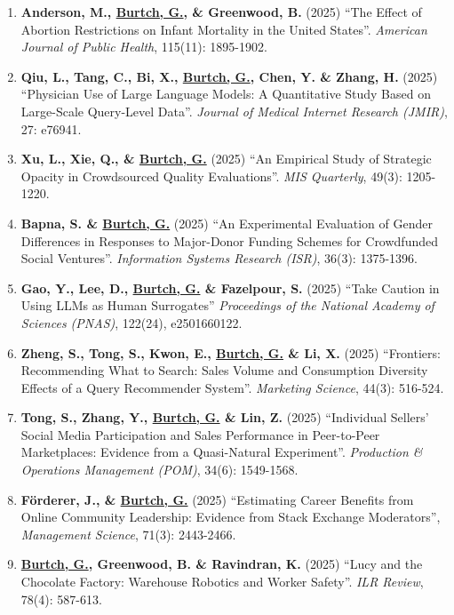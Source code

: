 \documentclass[10.5pt,letterpaper,sans]{moderncv}        %
\begin{document}
\begin{enumerate}[leftmargin=!,labelindent=5pt,itemindent=-15pt]
\item \textbf{Anderson, M., \underline{Burtch, G.}, \& Greenwood, B.} (2025) ``The Effect of Abortion Restrictions on Infant Mortality in the United States''. \textit{American Journal of Public Health}, 115(11): 1895-1902.

\item \textbf{Qiu, L., Tang, C., Bi, X., \underline{Burtch, G.}, Chen, Y. \& Zhang, H.} (2025) ``Physician Use of Large Language Models: A Quantitative Study Based on Large-Scale Query-Level Data''. \textit{Journal of Medical Internet Research (JMIR)}, 27: e76941.

\item \textbf{Xu, L., Xie, Q., \& \underline{Burtch, G.}} (2025) ``An Empirical Study of Strategic Opacity in Crowdsourced Quality Evaluations''. \textit{MIS Quarterly}, 49(3): 1205-1220.

\item \textbf{Bapna, S. \& \underline{Burtch, G.}} (2025) ``An Experimental Evaluation of Gender Differences in Responses to Major-Donor Funding Schemes for Crowdfunded Social Ventures''. \textit{Information Systems Research (ISR)}, 36(3): 1375-1396.

\item \textbf{Gao, Y., Lee, D., \underline{Burtch, G.} \& Fazelpour, S.} (2025) ``Take Caution in Using LLMs as Human Surrogates'' \textit{Proceedings of the National Academy of Sciences (PNAS)}, 122(24), e2501660122.

\item \textbf{Zheng, S., Tong, S., Kwon, E., \underline{Burtch, G.} \& Li, X.} (2025) ``Frontiers: Recommending What to Search: Sales Volume and Consumption Diversity Effects of a Query Recommender System''. \textit{Marketing Science}, 44(3): 516-524.

\item \textbf{Tong, S., Zhang, Y.,  \underline{Burtch, G.} \& Lin, Z.} (2025) ``Individual Sellers' Social Media Participation and Sales Performance in Peer-to-Peer Marketplaces: Evidence from a Quasi-Natural Experiment''. \textit{Production \& Operations Management (POM)}, 34(6): 1549-1568.

\item \textbf{F{\"o}rderer, J., \& \underline{Burtch, G.}} (2025) ``Estimating Career Benefits from Online Community Leadership: Evidence from Stack Exchange Moderators'', \textit{Management Science}, 71(3): 2443-2466.

\item \textbf{\underline{Burtch, G.}, Greenwood, B. \& Ravindran, K.} (2025) ``Lucy and the Chocolate Factory: Warehouse Robotics and Worker Safety''. \textit{ILR Review}, 78(4): 587-613.


\end{enumerate}
\end{document}

